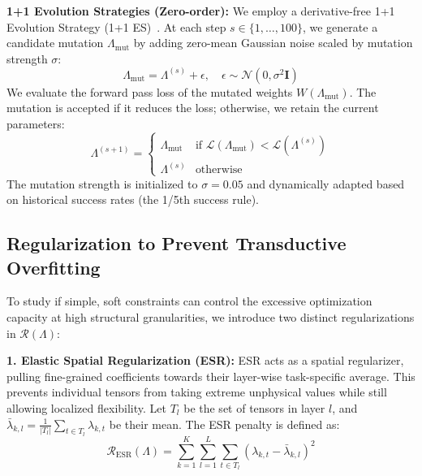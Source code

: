 \textbf{1+1 Evolution Strategies (Zero-order):} 
We employ a derivative-free 1+1 Evolution Strategy (1+1 ES)~\cite{rechenberg1973evolutionsstrategie}. 
At each step $s \in \{1, \dots, 100\}$, we generate a candidate mutation $\Lambda_{\text{mut}}$ by adding zero-mean Gaussian noise scaled by mutation strength $\sigma$:
\begin{equation}
\Lambda_{\text{mut}} = \Lambda^{(s)} + \epsilon, \quad \epsilon \sim \mathcal{N}(0, \sigma^2 \mathbf{I})
\end{equation}
We evaluate the forward pass loss of the mutated weights $W(\Lambda_{\text{mut}})$. 
The mutation is accepted if it reduces the loss; otherwise, we retain the current parameters:
\begin{equation}
\Lambda^{(s+1)} = \begin{cases} 
\Lambda_{\text{mut}} & \text{if } \mathcal{L}(\Lambda_{\text{mut}}) < \mathcal{L}(\Lambda^{(s)}) \\
\Lambda^{(s)} & \text{otherwise}
\end{cases}
\end{equation}
The mutation strength is initialized to $\sigma=0.05$ and dynamically adapted based on historical success rates (the 1/5th success rule).

\subsection{Regularization to Prevent Transductive Overfitting}

To study if simple, soft constraints can control the excessive optimization capacity at high structural granularities, we introduce two distinct regularizations in $\mathcal{R}(\Lambda)$:

\textbf{1. Elastic Spatial Regularization (ESR):} 
ESR acts as a spatial regularizer, pulling fine-grained coefficients towards their layer-wise task-specific average. 
This prevents individual tensors from taking extreme unphysical values while still allowing localized flexibility. 
Let $T_l$ be the set of tensors in layer $l$, and $\bar{\lambda}_{k, l} = \frac{1}{|T_l|}\sum_{t \in T_l} \lambda_{k, t}$ be their mean. 
The ESR penalty is defined as:
\begin{equation}
\mathcal{R}_{\text{ESR}}(\Lambda) = \sum_{k=1}^K \sum_{l=1}^L \sum_{t \in T_l} \left( \lambda_{k, t} - \bar{\lambda}_{k, l} \right)^2
\end{equation}

